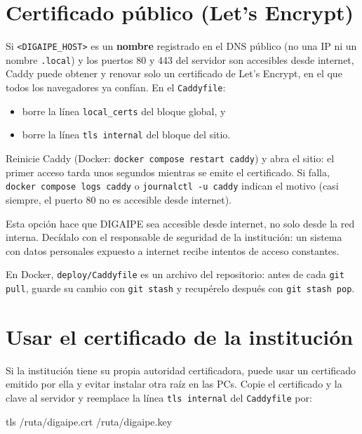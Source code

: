 \section{Certificado público (Let's Encrypt)}
\label{sec:letsencrypt}

Si \texttt{<DIGAIPE\_HOST>} es un \textbf{nombre} registrado en el DNS público (no una IP ni un
nombre \texttt{.local}) y los puertos 80 y 443 del servidor son accesibles desde internet, Caddy
puede obtener y renovar solo un certificado de Let's Encrypt, en el que todos los navegadores ya
confían. En el \texttt{Caddyfile}:

\begin{itemize}
	\item borre la línea \texttt{local\_certs} del bloque global, y
	\item borre la línea \texttt{tls internal} del bloque del sitio.
\end{itemize}

Reinicie Caddy (Docker: \texttt{docker compose restart caddy}) y abra el sitio: el primer acceso
tarda unos segundos mientras se emite el certificado. Si falla, \texttt{docker compose logs caddy}
o \texttt{journalctl -u caddy} indican el motivo (casi siempre, el puerto 80 no es accesible
desde internet).

\begin{aviso}
	Esta opción hace que DIGAIPE sea accesible desde internet, no solo desde la red interna.
	Decídalo con el responsable de seguridad de la institución: un sistema con datos personales
	expuesto a internet recibe intentos de acceso constantes.
\end{aviso}

En Docker, \texttt{deploy/Caddyfile} es un archivo del repositorio: antes de cada
\texttt{git pull}, guarde su cambio con \texttt{git stash} y recupérelo después con
\texttt{git stash pop}.

\section{Usar el certificado de la institución}

Si la institución tiene su propia autoridad certificadora, puede usar un certificado emitido por
ella y evitar instalar otra raíz en las PCs. Copie el certificado y la clave al servidor y
reemplace la línea \texttt{tls internal} del \texttt{Caddyfile} por:

\begin{codigo}
tls /ruta/digaipe.crt /ruta/digaipe.key
\end{codigo}

